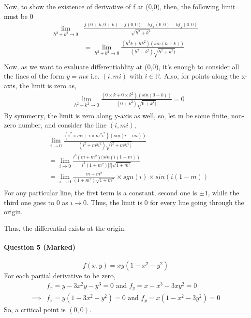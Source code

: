 \documentclass[20pt,a4paper]{extarticle} %
\theoremstyle{definition}
\theoremstyle{definition}
\begin{document}
Now, to show the existence of derivative of f at (0,0), then, the following limit must be 0
\begin{equation*}
	\begin{split}
		\lim_{h^2+k^2 \to 0}&\frac{f(0+h,0+k)-f(0,0) -hf_x(0,0)-kf_y(0,0)
		}{\sqrt{h^2+k^2}} \\
		&=\lim_{h^2+k^2 \to 0} \frac{(h^2k+hk^2)(sin(h-k))}{(h^2+k^2)\sqrt{h^2+k^2)}} \\
	\end{split}
\end{equation*}
Now, as we want to evaluate differentiablity at (0,0), it's enough to consider all the lines of the
form $y=mx$ i.e. $(i,mi) \text{ with } i \in \mathbb{R}$. Also, for points along the x-axis, the limit is zero as,
\begin{equation*}
	\begin{split}
		&\lim_{h^2+k^2 \to 0} \frac{(0 \times k+0 \times k^2)(sin(0-k))}{(0+k^2)\sqrt{0+k^2)}}=0
	\end{split}
\end{equation*}
By symmetry, the limit is zero along y-axis as well, so, let m be some finite, non-zero number,
and consider the line $(i,mi)$,
\begin{equation*}
	\begin{split}
		&\lim_{i \to 0} \frac{(i^2 \times mi+i \times m^2i^2)
		(sin(i-mi))}{(i^2+m^2i^2)\sqrt{i^2+m^2i^2)}}\\
		&=\lim_{i \to 0} \frac{i^3(m+m^2)(sin(i(1-m))}{i^2(1+m^2) |i|\sqrt{1+m^2}}\\
		&=\lim_{i \to 0} \frac{m+m^2}{(1+m^2) \sqrt{1+m^2}} \times sgn(i) \times sin(i(1-m)) \\
	\end{split}
\end{equation*}
For any particular line, the first term is a constant, second one is $\pm 1$, while the third one goes
to $0$ as $i \to 0$. Thus, the limit is $0$ for every line going through the origin.

Thus, the differential exists at the origin.


\newpage


\paragraph{Question 5 (Marked)}
\[ f(x,y)=xy(1-x^2-y^2) \]
For each partial derivative to be zero,
\begin{align*}
	& f_x=y-3x^2y-y^3=0 \text{ and }f_y=x-x^3-3xy^2=0 \\
	\implies & f_x=y(1-3x^2-y^2)=0 \text{ and } f_y=x(1-x^2-3y^2)=0
\end{align*}
So, a critical point is $(0,0)$.\\
\end{document}
